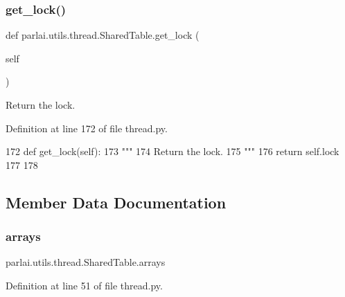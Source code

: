 \subsubsection{\texorpdfstring{get\+\_\+lock()}{get\_lock()}}
{\footnotesize\ttfamily def parlai.\+utils.\+thread.\+Shared\+Table.\+get\+\_\+lock (\begin{DoxyParamCaption}\item[{}]{self }\end{DoxyParamCaption})}

\begin{DoxyVerb}Return the lock.
\end{DoxyVerb}
 

Definition at line 172 of file thread.\+py.


\begin{DoxyCode}
172     \textcolor{keyword}{def }get\_lock(self):
173         \textcolor{stringliteral}{"""}
174 \textcolor{stringliteral}{        Return the lock.}
175 \textcolor{stringliteral}{        """}
176         \textcolor{keywordflow}{return} self.lock
177 
178 
\end{DoxyCode}


\subsection{Member Data Documentation}
\mbox{\label{classparlai_1_1utils_1_1thread_1_1SharedTable_a722e0cb6428af2282f4a2697c2c86d01}} 
\subsubsection{\texorpdfstring{arrays}{arrays}}
{\footnotesize\ttfamily parlai.\+utils.\+thread.\+Shared\+Table.\+arrays}



Definition at line 51 of file thread.\+py.

\mbox{\label{classparlai_1_1utils_1_1thread_1_1SharedTable_aec0fa85ca2544dd6220db34c7da01a08}} 

